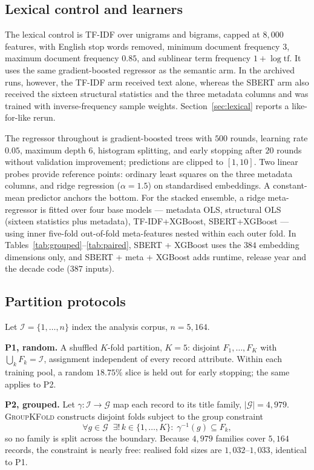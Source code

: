 \documentclass[conference,a4paper]{IEEEtran}
\newcommand{\hlt}[1]{\textbf{#1}}
\begin{document}
\subsection{Lexical control and learners}

The lexical control is TF-IDF over unigrams and bigrams, capped at
$8{,}000$ features, with English stop words removed, minimum document
frequency $3$, maximum document frequency $0.85$, and sublinear term
frequency $1 + \log \mathrm{tf}$. It uses the same gradient-boosted
regressor as the semantic arm. In the archived runs, however, the TF-IDF
arm received text alone, whereas the SBERT arm also received the sixteen
structural statistics and the three metadata columns and was trained
with inverse-frequency sample weights. Section~\ref{sec:lexical} reports
a like-for-like rerun.

The regressor throughout is gradient-boosted trees with $500$ rounds,
learning rate $0.05$, maximum depth $6$, histogram splitting, and early
stopping after $20$ rounds without validation improvement; predictions
are clipped to $[1, 10]$. Two linear probes provide reference points:
ordinary least squares on the three metadata columns, and ridge
regression ($\alpha = 1.5$) on standardised embeddings. A constant-mean
predictor anchors the bottom. For the stacked ensemble, a ridge
meta-regressor is fitted over four base models --- metadata OLS,
structural OLS (sixteen statistics plus metadata), TF-IDF+XGBoost,
SBERT+XGBoost --- using inner five-fold out-of-fold meta-features nested
within each outer fold. In Tables~\ref{tab:grouped}--\ref{tab:paired},
SBERT + XGBoost uses the $384$ embedding dimensions only, and SBERT +
meta + XGBoost adds runtime, release year and the decade code ($387$
inputs).

\subsection{Partition protocols}
\label{sec:splits}

Let $\mathcal{I} = \{1, \dots, n\}$ index the analysis corpus,
$n = 5{,}164$.

\hlt{P1, random.} A shuffled $K$-fold partition, $K = 5$: disjoint
$F_1, \dots, F_K$ with $\bigcup_k F_k = \mathcal{I}$, assignment
independent of every record attribute. Within each training pool, a
random $18.75\%$ slice is held out for early stopping; the same applies
to P2.

\hlt{P2, grouped.} Let $\gamma: \mathcal{I} \to \mathcal{G}$ map each
record to its title family, $|\mathcal{G}| = 4{,}979$.
\textsc{GroupKFold} constructs disjoint folds subject to the group
constraint
\begin{equation}
\label{eq:group}
\forall g \in \mathcal{G}\;\; \exists!\, k \in \{1,\dots,K\}:\;
\gamma^{-1}(g) \subseteq F_k ,
\end{equation}
so no family is split across the boundary. Because $4{,}979$ families
cover $5{,}164$ records, the constraint is nearly free: realised fold
sizes are $1{,}032$--$1{,}033$, identical to P1.
\end{document}
